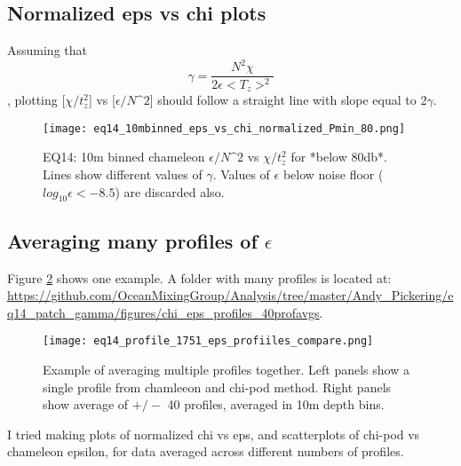 \documentclass[11pt]{article}
\begin{document}
\clearpage
\subsection{Normalized eps vs chi plots}

Assuming that
\begin{equation}
\gamma=\frac{N^2 \chi}{2\epsilon<T_z>^2}
\end{equation}
, plotting [$\chi/t_{z}^{2}$] vs [$\epsilon/N\^2$] should follow a straight line with slope equal to $2\gamma$.


\begin{figure}[htbp]
\texttt{[image: eq14\_10mbinned\_eps\_vs\_chi\_normalized\_Pmin\_80.png]}
\caption{EQ14: 10m binned  chameleon $\epsilon/N\^2$ vs $\chi/t_{z}^{2}$ for *below 80db*. Lines show different values of $\gamma$. Values of $\epsilon$ below noise floor ($log_{10}\epsilon<-8.5$) are discarded also.}
\label{}
\end{figure}





\clearpage
\subsection{Averaging many profiles of $\epsilon$}

Figure \ref{prof_avg_ex} shows one example. A folder with many profiles is located at:
\url{https://github.com/OceanMixingGroup/Analysis/tree/master/Andy_Pickering/eq14_patch_gamma/figures/chi_eps_profiles_40profavgs}. %

\begin{figure}[htbp]
\texttt{[image: eq14\_profile\_1751\_eps\_profiiles\_compare.png]}
\caption{Example of averaging multiple profiles together. Left panels show a single profile from chamleeon and chi-pod method. Right panels show average of $+/-$ 40 profiles, averaged in 10m depth bins.}
\label{prof_avg_ex}
\end{figure}



I tried making plots of normalized chi vs eps, and scatterplots of chi-pod vs chameleon epsilon, for data averaged across different numbers of profiles. 
\end{document}
